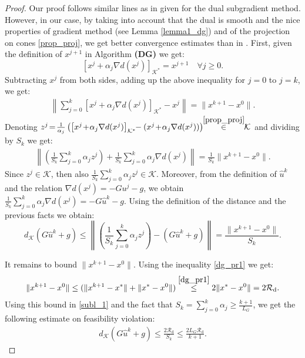 \documentclass{gOMS2e}
\theoremstyle{plain}
\theoremstyle{definition}
\theoremstyle{remark}
\providecommand{\norm}[1]{\lVert#1\rVert}
\begin{document}
\begin{proof} Our proof follows similar lines as in
\cite[Proposition 1]{NedOzd:09} given for the dual subgradient
method. However, in our case, by taking into account that the dual
is smooth and the nice properties of gradient method (see Lemma
\ref{lemma1_dg}) and of the projection on cones \eqref{prop_proj},
we get better convergence estimates than in \cite{NedOzd:09}. First,
given the definition of $x^{j+1}$ in Algorithm \textbf{(DG)} we get:
\[  \left[x^j + \alpha_j \nabla d(x^j)\right]_{\mathcal{K}^*} = x^{j+1} \quad \forall j \geq 0.\]
Subtracting $x^j$ from both sides, adding up the above inequality
for $j\!=\!0$ to $j\!=\!k$, we get:
\begin{align*}
\left\|\sum_{j=0}^k \left[x^j + \alpha_j \nabla
d(x^j)\right]_{\mathcal{K}^*} - x^j\right\| = \norm{x^{k+1} - x^0}.
\end{align*}
Denoting $z^j \!=\! \frac{1}{\alpha_j} \left( \left[ x^j \!+\!
\alpha_j \nabla d(x^j) \right]_{\mathcal{K}^*} \!\!-  (x^j \!+\!
\alpha_j \nabla d(x^j)) \right)
\!\!\overset{\eqref{prop_proj}}{\in}\!\! {\mathcal{K}}$ and dividing by $S_k$
we get:
\begin{align*}
\left\| \left(\frac{1}{S_k}\sum_{j=0}^k \alpha_j z^j \right) +
\frac{1}{S_k}\sum_{j=0}^k \alpha_j \nabla d(x^j)  \right\| =
\frac{1}{S_k}\norm{x^{k+1} - x^0}.
\end{align*}
Since $z^j \in \mathcal{K}$,  then also $
\frac{1}{S_k}\sum\limits_{j=0}^k \alpha_j z^j \in \mathcal{K}$.
Moreover, from the definition of $\hat u^k$ and the relation $\nabla
d (x^j) = - Gu^j - g$, we obtain $\frac{1}{S_k}\sum_{j=0}^k \alpha_j
\nabla d(x^j) = - G \hat u^k - g$. Using the definition of the
distance and the previous facts  we obtain:
\begin{equation}\label{subl_1}
 d_{\mathcal{K}}(G\hat{u}^k+g) \le
\left\| \left(\frac{1}{S_k}\sum_{j=0}^k \alpha_j z^j \right) - (G
\hat u^k + g) \right\| = \frac{\norm{x^{k+1} - x^0}}{S_k}.
\end{equation}

\noindent It remains to bound $\norm{x^{k+1} -x^0}$. Using the
inequality \eqref{dg_pr1} we get:
\begin{align*}
\norm{x^{k+1} - x^0}  \leq (\|x^{k+1} - x^*\| + \|x^* -x^0\|)
\overset{\eqref{dg_pr1}}{\leq} 2 \| x^* - x^0\|  = 2
\mathcal{R}_\text{d}.
\end{align*}
Using this bound in  \eqref{subl_1} and the fact that  $S_k =
\sum_{j=0}^k \alpha_j \geq \frac{k+1}{L_G}$, we get the following
estimate on feasibility violation:
\begin{align}
\label{subl_2} d_{\mathcal{K}}(G\hat{u}^k+g)  \leq  \frac{2
\mathcal{R}_\text{d}}{S_k} \leq  \frac{2 L_G
\mathcal{R}_\text{d}}{k+1}.
\end{align}


\end{proof}
\end{document}
